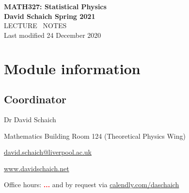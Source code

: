 \documentclass[12 pt]{article}
\newcommand{\TODO}[1]{\textcolor{red}{\textbf{#1}}}
\begin{document}
\begin{center}
  {\LARGE \textbf{MATH327: Statistical Physics}} \\[6 pt]
  \textbf{David Schaich \qquad\qquad\qquad\qquad Spring 2021} \\[48 pt]
  {\LARGE LECTURE \ NOTES} \\[6 pt]
  Last modified 24 December 2020
\end{center}
\renewcommand{\contentsname}{}
\setcounter{tocdepth}{1}
\tableofcontents



\newpage
\setcounter{section}{0}
\section*{Module information}
\subsection*{Coordinator}
\begin{description}
  \setlength{\itemsep}{1pt}
  \setlength{\parskip}{0pt}
  \setlength{\parsep}{0pt}
  \item[\qquad] Dr David Schaich
  \item[\qquad] Mathematics Building Room 124 (Theoretical Physics Wing)
  \item[\qquad] \href{mailto:david.schaich@liverpool.ac.uk}{david.schaich@liverpool.ac.uk}
  \item[\qquad] \href{http://www.davidschaich.net}{www.davidschaich.net} \\
  \item[\qquad] Office hours: \TODO{...} and by request via \href{https://calendly.com/daschaich}{calendly.com/daschaich}
\end{description}



\end{document}

